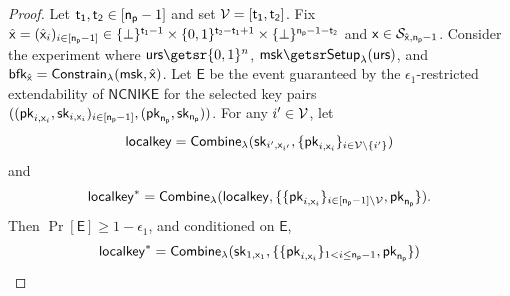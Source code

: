 \begin{proof}
Let $\mathsf{t_1}, \mathsf{t_2} \in [\mathsf{n_p}-1]$ and set $\mathcal{V} = [\mathsf{t_1}, \mathsf{t_2}]$. Fix $\hat{\mathsf{x}} = (\hat{\mathsf{x}}_i)_{i \in [\mathsf{n_p}-1]} \in \{\bot\}^{\mathsf{t_1}-1} \times \{0, 1\}^{\mathsf{t_2}-\mathsf{t_1}+1} \times \{\bot\}^{\mathsf{n_p}-1-\mathsf{t_2}}$ and $\mathsf{x} \in \mathcal{S}_{\hat{\mathsf{x}},\mathsf{n_p}-1}$. Consider the experiment where $\urs \getsr \bin^{n}$, $\bprfmsk \getsr \bprfsetup(\urs)$, and $\mathsf{bfk}_{\hat{\mathsf{x}}} = \mathsf{Constrain}_{\lambda}(\mathsf{msk}, \hat{\mathsf{x}})$. Let $\mathsf{E}$ be the event guaranteed by the $\epsilon_1$-restricted extendability of $\mathsf{NCNIKE}$ for the selected key pairs $((\mathsf{pk}_{i,\mathsf{x}_i},\mathsf{sk}_{i,\mathsf{x}_i})_{i\in[\mathsf{n_p}-1]},(\mathsf{pk}_{\mathsf{n_p}},\mathsf{sk}_{\mathsf{n_p}}))$. For any $i^{\prime} \in \mathcal{V}$, let
\[
\mathsf{localkey} = \mathsf{Combine}_{\lambda}(\mathsf{sk}_{i^{\prime},\mathsf{x}_{i^{\prime}}}, \{\mathsf{pk}_{i,\mathsf{x}_i}\}_{i\in\mathcal{V}\backslash\{i^{\prime}\}})
\]
and
\[
\mathsf{localkey}^* = \mathsf{Combine}_{\lambda}(\mathsf{localkey}, \{\{\mathsf{pk}_{i,\mathsf{x}_i}\}_{i\in[\mathsf{n_p}-1]\backslash\mathcal{V}},\mathsf{pk}_{\mathsf{n_p}}\}).
\]
Then $\Pr[\mathsf{E}] \geq 1-\epsilon_1$, and conditioned on $\mathsf{E}$,
\[\begin{split}
\mathsf{localkey}^* = \mathsf{Combine}_{\lambda}(\mathsf{sk}_{1,\mathsf{x}_1}, \{\{\mathsf{pk}_{i, \mathsf{x}_i}\}_{1<i\leq\mathsf{n_p}-1}, \mathsf{pk}_{\mathsf{n_p}}\})
\end{split}\]

\end{proof}
